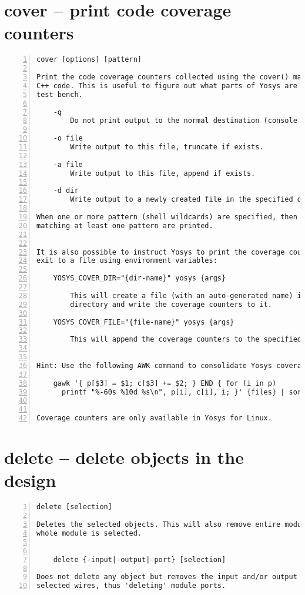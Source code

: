 \section{cover -- print code coverage counters}
\label{cmd:cover}
\begin{lstlisting}[numbers=left,frame=single]
    cover [options] [pattern]

Print the code coverage counters collected using the cover() macro in the Yosys
C++ code. This is useful to figure out what parts of Yosys are utilized by a
test bench.

    -q
        Do not print output to the normal destination (console and/or log file)

    -o file
        Write output to this file, truncate if exists.

    -a file
        Write output to this file, append if exists.

    -d dir
        Write output to a newly created file in the specified directory.

When one or more pattern (shell wildcards) are specified, then only counters
matching at least one pattern are printed.


It is also possible to instruct Yosys to print the coverage counters on program
exit to a file using environment variables:

    YOSYS_COVER_DIR="{dir-name}" yosys {args}

        This will create a file (with an auto-generated name) in this
        directory and write the coverage counters to it.

    YOSYS_COVER_FILE="{file-name}" yosys {args}

        This will append the coverage counters to the specified file.


Hint: Use the following AWK command to consolidate Yosys coverage files:

    gawk '{ p[$3] = $1; c[$3] += $2; } END { for (i in p)
      printf "%-60s %10d %s\n", p[i], c[i], i; }' {files} | sort -k3


Coverage counters are only available in Yosys for Linux.
\end{lstlisting}

\section{delete -- delete objects in the design}
\label{cmd:delete}
\begin{lstlisting}[numbers=left,frame=single]
    delete [selection]

Deletes the selected objects. This will also remove entire modules, if the
whole module is selected.


    delete {-input|-output|-port} [selection]

Does not delete any object but removes the input and/or output flag on the
selected wires, thus 'deleting' module ports.
\end{lstlisting}


